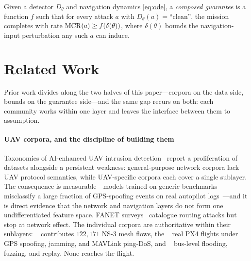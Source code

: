 \begin{definition}
\label{def:composed}
Given a detector $D_\theta$ and navigation dynamics \eqref{eq:ode}, a
\emph{composed guarantee} is a function $f$ such that for every attack $a$ with
$D_\theta(a)=\text{``clean''}$, the mission completes with rate
$\mathrm{MCR}(a)\ge f(\delta(\theta))$, where $\delta(\theta)$ bounds the
navigation-input perturbation any such $a$ can induce.
\end{definition}

\section{Related Work}
\label{sec:related}
Prior work divides along the two halves of this paper---corpora on the data
side, bounds on the guarantee side---and the same gap recurs on both: each
community works within one layer and leaves the interface between them to
assumption.

\paragraph{UAV corpora, and the discipline of building them}
Taxonomies of AI-enhanced UAV intrusion detection~\cite{islam2025uavids} report
a proliferation of datasets alongside a persistent weakness: general-purpose
network corpora lack UAV protocol semantics, while UAV-specific corpora each
cover a single sublayer. The consequence is measurable---models trained on
generic benchmarks misclassify a large fraction of GPS-spoofing events on real
autopilot logs~\cite{islam2025uavids}---and it is direct evidence that the
network and navigation layers do not form one undifferentiated feature space.
FANET surveys~\cite{tsao2022survey,ceviz2024survey} catalogue routing attacks
but stop at network effect. The individual corpora are authoritative within
their sublayers: ~\cite{uavids2025,zeng2025uavids}
contributes $122{,}171$ NS-3 mesh flows, the ~\cite{whelan2020uav,whelan2020novelty} real PX4 flights under GPS
spoofing, jamming, and MAVLink ping-DoS, and ~\cite{hcrl_uavcan} bus-level flooding, fuzzing, and replay. None reaches
the flight.

